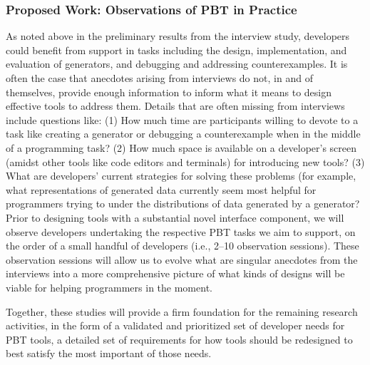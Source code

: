  

\subsubsection{Proposed Work: Observations of PBT in Practice}
\label{sec:observations}

As noted above in the preliminary results from the interview study, developers 
could benefit from support in tasks including the design, implementation, and 
evaluation of generators, and debugging and addressing counterexamples. It is 
often the case that anecdotes arising from interviews do not, in and of 
themselves, provide enough information to inform what it means to design 
effective tools to address them. Details that are often missing from interviews 
include questions like: (1) How much time are participants willing to devote to 
a task like creating a generator or debugging a counterexample when in the 
middle of a programming task? (2) How much space is available on a developer's
screen (amidst other tools like code editors and terminals) for introducing new 
tools? (3) What are developers' current strategies for solving these problems 
(for example, what representations of generated data currently seem most helpful 
for programmers trying to under the distributions of data generated by a 
generator? Prior to designing tools with a substantial novel interface 
component, we will observe developers undertaking the respective PBT tasks we 
aim to support, on the order of a small handful of developers (i.e., 2--10 
observation sessions). These observation sessions will allow us to evolve what 
are singular anecdotes from the interviews into a more comprehensive picture of 
what kinds of designs will be viable for helping programmers in the moment.


 

Together, these studies will provide a firm foundation for the remaining
research activities, in the form of a validated and prioritized set of developer 
needs for PBT tools, a detailed set of requirements for how tools should be 
redesigned to best satisfy the most important of those needs.

